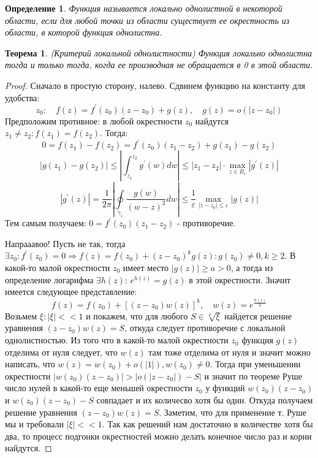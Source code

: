 \documentclass[12pt,a4paper]{article} %
\newtheorem{theorem}{Теорема}
\newtheorem{definition}{Определение}
\begin{document}
	\begin{definition}
		Функция называется локально однолистной в некоторой области, если для любой точки из области существует ее окрестность из области, в которой функция однолистна.
	\end{definition}
	\begin{theorem}\label{лок_однолист}
		(Критерий локальной однолистности) Функция локально однолистна тогда и только тогда, когда ее производная не обращается в 0 в этой области.
	\end{theorem}
	\begin{proof}
		Сначало в простую сторону, налево. Сдвинем функцию на константу для удобства:
		$$z_0:\quad f(z)=f^{'}(z_0)(z-z_0)+g(z),\quad g(z)=o(|z-z_0|)$$
		Предположим противное: в любой окрестности $z_0$ найдутся $z_1\neq z_2: f(z_1)=f(z_2)$. Тогда:
		$$0=f(z_1)-f(z_2)=f^{'}(z_0)(z_1-z_2)+g(z_1)-g(z_2)$$
		$$|g(z_1)-g(z_2)|\leq\left|\int_{z_1}^{z_2}g^{'}(w)dw\right|\leq|z_1-z_2|\cdot\underset{z\in B_{\varepsilon}}{\max}|g^{'}(z)|$$
		$$|g^{'}(z)|=\frac{1}{2\pi}\left|\oint\limits_{\gamma_{\varepsilon}}\frac{g(w)}{(w-z)^2}dw\right|\leq\frac{1}{\varepsilon}\underset{|z-z_0|\leq\varepsilon}{\max}|g(z)|$$
		Тем самым получаем: $0=f^{'}(z_0)(z_1-z_2)$ - противоречие.
		
		Напрааавоо! Пусть не так, тогда $\exists z_0:f^{'}(z_0)=0\Rightarrow f(z)=f(z_0)+(z-z_0)^kg(z):g(z_0)\neq 0,k\geq 2$. В какой-то малой окрестности $z_0$ имеет место $|g(z)|\geq a>0$, а тогда из определение логарифма $\exists h(z):\,e^{h(z)}=g(z)$ в этой окрестности. Значит имеется следующее представление:
		$$f(z)=f(z_0)+[(z-z_0)w(z)]^k,\quad w(z)=e^{\frac{h(z)}{k}}$$
		Возьмем $\xi:|\xi|<<1$ и покажем, что для любого $S\in\sqrt[k]{\xi}$ найдется решение уравнения $(z-z_0)w(z)=S$, откуда следует противоречие с локальной однолистностью. Из того что в какой-то малой окрестности $z_0$ функция $g(z)$ отделима от нуля следует, что $w(z)$ там тоже отделима от нуля и значит можно написать, что $w(z)=w(z_0)+o(|1|), w(z_0)\neq 0$. Тогда при уменьшении окрестности $|w(z_0)(z-z_0)|>|o(|z-z_0|)-S|$ и значит по теореме Руше число нулей в какой-то еще меньшей окрестности $z_0$ у функций $w(z_0)(z-z_0)$ и $w(z_0)(z-z_0)-S$ совпадает и их количесво хотя бы один. Откуда получаем решение уравнения $(z-z_0)w(z)=S$. Заметим, что для применение т. Руше мы и требовали $|\xi|<<1$. Так как решений нам достаточно в количестве хотя бы два, то процесс подгонки окрестностей можно делать конечное число раз и корни найдутся.
	\end{proof}
\end{document}
